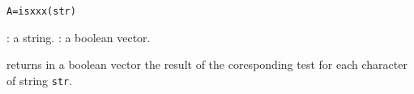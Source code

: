 
\begin{mandesc}
\\
\\
\\
\\
\\
\\
\\
\\
\\
\\
\end{mandesc}
\begin{calling_sequence}
\begin{verbatim}
A=isxxx(str)
\end{verbatim}
\end{calling_sequence}

\begin{parameters}
  \begin{varlist}
     : a string.
     : a boolean vector.
  \end{varlist}
\end{parameters}

\begin{mandescription}
returns in a boolean vector the result of the coresponding test 
for each character of string \verb+str+.
\end{mandescription}

